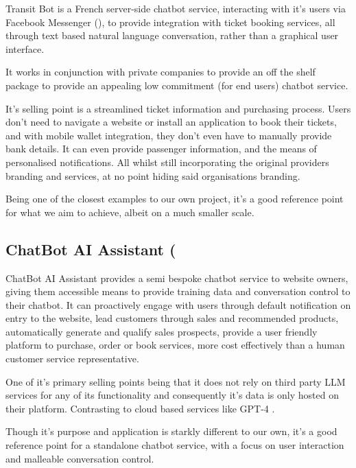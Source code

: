 \documentclass[11pt]{article}
\begin{document}
Transit Bot is a French server-side chatbot service, interacting with it's users via Facebook Messenger (\cite{messenger}), to provide integration with ticket booking services, all through text based natural language conversation, rather than a graphical user interface.

It works in conjunction with private companies to provide an off the shelf package to provide an appealing low commitment (for end users) chatbot service.

It's selling point is a streamlined ticket information and purchasing process. Users don't need to navigate a website or install an application to book their tickets, and with mobile wallet integration, they don't even have to manually provide bank details. It can even provide passenger information, and the means of personalised notifications. All whilst still incorporating the original providers branding and services, at no point hiding said organisations branding.

Being one of the closest examples to our own project, it's a good reference point for what we aim to achieve, albeit on a much smaller scale.

\subsection{ChatBot AI Assistant (\texorpdfstring{\cite{chatbotai-assist}})} \label{chatbot-ai-assistant}

ChatBot AI Assistant provides a semi bespoke chatbot service to website owners, giving them accessible means to provide training data and conversation control to their chatbot. It can proactively engage with users through default notification on entry to the website, lead customers through sales and recommended products, automatically generate and qualify sales prospects, provide a user friendly platform to purchase, order or book services, more cost effectively than a human customer service representative.

One of it's primary selling points being that it does not rely on third party LLM services for any of its functionality and consequently it's data is only hosted on their platform. Contrasting to cloud based services like GPT-4 \cite{gpt4}.

Though it's purpose and application is starkly different to our own, it's a good reference point for a standalone chatbot service, with a focus on user interaction and malleable conversation control.
\end{document}
